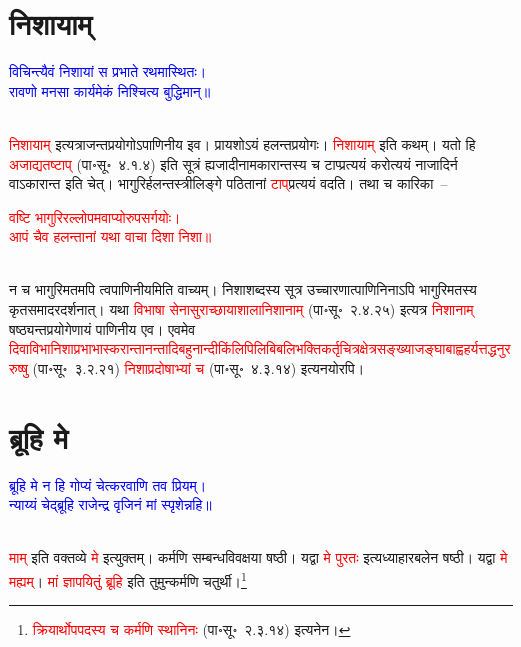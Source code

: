 \section[निशायाम्]{निशायाम्‌}
\centering\textcolor{blue}{विचिन्त्यैवं निशायां स प्रभाते रथमास्थितः।\nopagebreak\\
रावणो मनसा कार्यमेकं निश्चित्य बुद्धिमान्॥}\nopagebreak\\
\\
\begin{sloppypar}\justifying\noindent\hspace{10mm} \textcolor{red}{निशायाम्‌} इत्यत्राजन्त\-प्रयोगोऽपाणिनीय इव। प्रायशोऽयं हलन्त\-प्रयोगः। \textcolor{red}{निशायाम्‌} इति कथम्। यतो हि \textcolor{red}{अजाद्यतष्टाप्‌} (पा॰सू॰~४.१.४) इति सूत्रं ह्यजादीनामकारान्तस्य च टाप्प्रत्ययं करोत्ययं नाजादिर्न वाऽकारान्त इति चेत्। भागुरिर्हलन्त\-स्त्रीलिङ्गे पठितानां \textcolor{red}{टाप्‌}\-प्रत्ययं वदति। तथा च कारिका~–\end{sloppypar}
\centering\textcolor{red}{वष्टि भागुरिरल्लोपमवाप्योरुपसर्गयोः।\nopagebreak\\
आपं चैव हलन्तानां यथा वाचा दिशा निशा॥}\nopagebreak\\
\\
\begin{sloppypar}\justifying\noindent न च भागुरि\-मतमपि त्वपाणिनीयमिति वाच्यम्। निशा\-शब्दस्य सूत्र उच्चारणात्पाणिनिनाऽपि भागुरि\-मतस्य कृत\-समादर\-दर्शनात्। यथा \textcolor{red}{विभाषा सेना\-सुराच्छाया\-शाला\-निशानाम्‌} (पा॰सू॰~२.४.२५) इत्यत्र \textcolor{red}{निशानाम्‌} षष्ठ्यन्त\-प्रयोगेणायं पाणिनीय एव। एवमेव \textcolor{red}{दिवा\-विभा\-निशा\-प्रभा\-भास्करान्तानन्तादि\-बहु\-नान्दीकिंलिपि\-लिबि\-बलि\-भक्ति\-कर्तृ\-चित्र\-क्षेत्र\-सङ्ख्या\-जङ्घा\-बाह्वहर्यत्तद्धनुररुष्षु} (पा॰सू॰~३.२.२१) \textcolor{red}{निशा\-प्रदोषाभ्यां च} (पा॰सू॰~४.३.१४) इत्यनयोरपि।\end{sloppypar}
\section[ब्रूहि मे]{ब्रूहि मे}
\centering\textcolor{blue}{ब्रूहि मे न हि गोप्यं चेत्करवाणि तव प्रियम्।\nopagebreak\\
न्याय्यं चेद्ब्रूहि राजेन्द्र वृजिनं मां स्पृशेन्नहि॥}\nopagebreak\\
\\
\begin{sloppypar}\justifying\noindent\hspace{10mm} \textcolor{red}{माम्‌} इति वक्तव्ये \textcolor{red}{मे} इत्युक्तम्। कर्मणि सम्बन्ध\-विवक्षया षष्ठी। यद्वा \textcolor{red}{मे पुरतः} इत्यध्याहार\-बलेन षष्ठी। यद्वा \textcolor{red}{मे मह्यम्‌}। \textcolor{red}{मां ज्ञापयितुं ब्रूहि} इति तुमुन्कर्मणि चतुर्थी।\footnote{\textcolor{red}{क्रियार्थोपपदस्य च कर्मणि स्थानिनः} (पा॰सू॰~२.३.१४) इत्यनेन।}\end{sloppypar}
